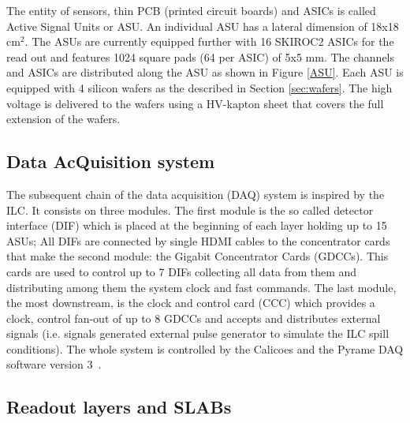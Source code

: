 \documentclass[a4paper,11pt]{article}
\begin{document}
The entity
of sensors, thin PCB (printed circuit boards) and ASICs is called Active Signal Units or ASU.
An individual ASU has a lateral dimension of 18x18 cm$^{2}$.
The ASUs are currently equipped
further with 16 SKIROC2 ASICs for the read out and features 1024 square pads (64 per ASIC) of 5x5 mm.
The channels and ASICs are distributed along the ASU as shown in Figure \ref{ASU}. Each ASU is equipped with 4 silicon wafers as the described in Section \ref{sec:wafers}.
The high voltage is delivered to the wafers using a HV-kapton sheet that covers the full extension of the wafers.

\subsection{Data AcQuisition system}
\label{sec:DAQ}

The subsequent chain of the data acquisition (DAQ)\cite{Gastaldi:2014vaa} system is inspired by the ILC.
It consists on three modules.
The first module is the so called detector interface (DIF) which is placed at the beginning of each layer holding up to 15 ASUs;
All DIFs are connected by single HDMI cables to the concentrator cards that make
the second module: the Gigabit Concentrator Cards (GDCCs).
This cards are used to control up to 7 DIFs collecting all data from them and distributing among them the system clock and fast commands.
The last module, the most downstream, is the clock and control card (CCC) which
provides a clock, control fan-out of up to 8 GDCCs and accepts and distributes external signals (i.e. signals
generated external pulse generator to simulate the ILC spill conditions).
The whole system is controlled by the Calicoes and the Pyrame DAQ software version 3~\cite{Rubio-Roy:2017ere,Magniette:2018wdz}.

\subsection{Readout layers and SLABs}
\label{sec:setup}
\end{document}
